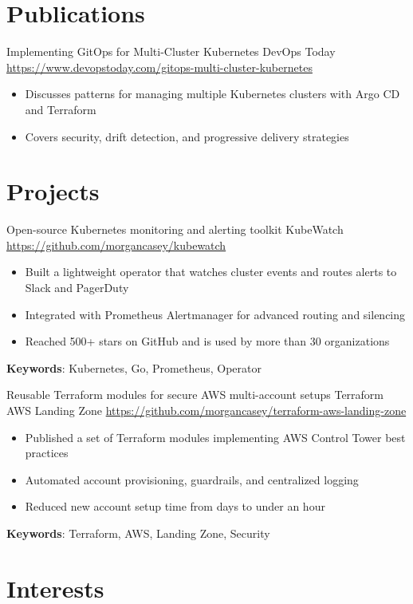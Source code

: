 \documentclass[a4paper, serif, 10pt]{moderncv}
\begin{document}
\section{Publications}

        {Implementing GitOps for Multi-Cluster Kubernetes}
        {DevOps Today}
        {\url{https://www.devopstoday.com/gitops-multi-cluster-kubernetes}}
        {}
        {\begin{itemize}
\item Discusses patterns for managing multiple Kubernetes clusters with Argo CD and Terraform
\item Covers security, drift detection, and progressive delivery strategies
\end{itemize}}
\section{Projects}

        {Open-source Kubernetes monitoring and alerting toolkit}
        {KubeWatch}
        {\url{https://github.com/morgancasey/kubewatch}}
        {}
        {\begin{itemize}
\item Built a lightweight operator that watches cluster events and routes alerts to Slack and PagerDuty
\item Integrated with Prometheus Alertmanager for advanced routing and silencing
\item Reached 500+ stars on GitHub and is used by more than 30 organizations
\end{itemize}
\textbf{Keywords}: Kubernetes, Go, Prometheus, Operator}

        {Reusable Terraform modules for secure AWS multi-account setups}
        {Terraform AWS Landing Zone}
        {\url{https://github.com/morgancasey/terraform-aws-landing-zone}}
        {}
        {\begin{itemize}
\item Published a set of Terraform modules implementing AWS Control Tower best practices
\item Automated account provisioning, guardrails, and centralized logging
\item Reduced new account setup time from days to under an hour
\end{itemize}
\textbf{Keywords}: Terraform, AWS, Landing Zone, Security}
\section{Interests}
\end{document}

